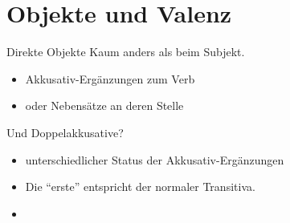 \section{Objekte und Valenz}

\begin{frame}
  {Direkte Objekte}
  \pause
   Kaum anders als beim Subjekt.
  \begin{itemize}[<+->]
    \item \alert{Akkusativ-Ergänzungen zum Verb}
    \item \alert{oder Nebensätze an deren Stelle}
  \end{itemize}
  \pause
  \Halbzeile
  Und Doppelakkusative?\\
  \begin{exe}
    \ex\label{ex:akkusativeunddirekteobjekte158}
    \begin{xlist}
      \pause
      \pause
      \pause
    \end{xlist}
  \end{exe}
  \pause
  \begin{itemize}[<+->]
    \item unterschiedlicher Status der Akkusativ-Ergänzungen
    \item Die "`erste"' entspricht der normaler Transitiva.
    \item {}
  \end{itemize} 
\end{frame}

